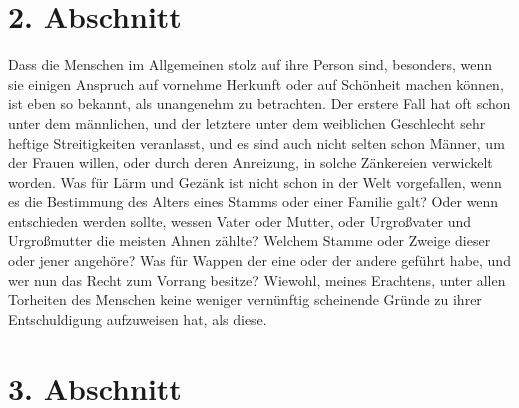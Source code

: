 \section{2. Abschnitt} \label{kap11_ab2}

Dass die Menschen im Allgemeinen stolz auf ihre Person sind, besonders, wenn sie
einigen Anspruch auf vornehme Herkunft oder auf
Schönheit machen können, ist eben
so bekannt, als unangenehm zu betrachten. Der erstere Fall hat oft schon unter
dem männlichen, und der letztere unter dem weiblichen Geschlecht sehr heftige
Streitigkeiten veranlasst, und es sind auch nicht selten schon Männer, um der
Frauen willen, oder durch deren Anreizung, in solche Zänkereien verwickelt
worden. Was für Lärm und Gezänk ist nicht schon in der Welt vorgefallen, wenn
es die Bestimmung des Alters eines Stamms oder einer Familie galt? Oder wenn
entschieden werden sollte, wessen Vater oder Mutter, oder Urgroßvater und
Urgroßmutter die meisten Ahnen zählte? Welchem Stamme oder Zweige dieser oder
jener angehöre? Was für Wappen der eine oder der andere geführt
habe, und wer
nun das Recht zum Vorrang besitze? Wiewohl, meines Erachtens, unter allen
Torheiten des Menschen keine weniger vernünftig scheinende Gründe zu ihrer
Entschuldigung aufzuweisen hat, als diese.

\section{3. Abschnitt} \label{kap11_ab3}

